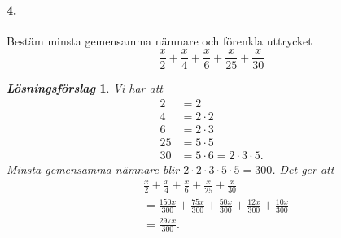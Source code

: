 \documentclass[a4paper]{article}
\newtheorem*{sol}{\normalfont\textit{Lösningsförslag}}
\begin{document}
\paragraph{4.} Bestäm minsta gemensamma nämnare och förenkla uttrycket
\[
\frac{x}{2} +\frac{x}{4}+\frac{x}{6}+\frac{x}{25}+\frac{x}{30}
\]
\begin{sol}
  Vi har att
  \begin{align*}
    2 &= 2 \\
    4 &= 2\cdot 2\\
    6 &= 2\cdot 3\\
    25&= 5\cdot 5\\
    30&= 5\cdot 6 = 2\cdot 3 \cdot 5.
  \end{align*}
  Minsta gemensamma nämnare blir $2\cdot 2\cdot 3 \cdot 5 \cdot 5 =
  300$. Det ger att 
\begin{align*}
&\frac{x}{2} +\frac{x}{4}+\frac{x}{6}+\frac{x}{25}+\frac{x}{30} \\[1em]
&= \frac{150x}{300}
  +\frac{75x}{300}+\frac{50x}{300}+\frac{12x}{300}+\frac{10x}{300} \\[1em]
  &= \frac{297x}{300}.
\end{align*}
\end{sol}
\end{document}
